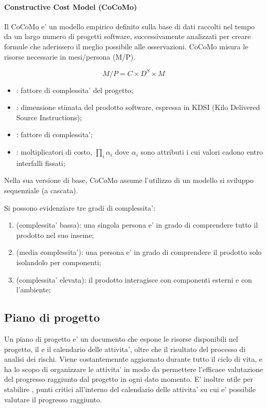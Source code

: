 \paragraph{Constructive Cost Model (CoCoMo)}

Il CoCoMo e' un modello empirico definito sulla base di dati raccolti nel tempo
da un largo numero di progetti software, successivamente analizzati per creare
formule che aderissero il meglio possibile alle osservazioni. CoCoMo misura le
risorse necessarie in mesi/persona (M/P).

\[
  M/P = C \times D^S \times M
\]

\begin{itemize}
  \item {}: fattore di complessita' del progetto;
  \item {}: dimensione stimata del prodotto software, espressa in KDSI
    (Kilo Delivered Source Instructions);
  \item {}: fattore di complessita';
  \item {}: moltiplicatori di costo, $\prod_i \alpha_i$ dove $\alpha_i$
    sono attributi i cui valori cadono entro interfalli fissati;
\end{itemize}

Nella sua versione di base, CoCoMo assume l'utilizzo di un modello si sviluppo
sequenziale (a cascata). 

Si possono evidenziare tre gradi di complessita':

\begin{enumerate}
  \item {} (complessita' bassa): una singola persona e' in grado
    di comprendere tutto il prodotto nel suo inseme;
  \item {} (media complessita'): una persona e' in grado di
    comprendere il prodotto solo isolandolo per componenti;
  \item {} (complessita' elevata): il prodotto
    interagisce con componenti esterni e con l'ambiente;
\end{enumerate}


\subsection{Piano di progetto}

Un piano di progetto e' un documento che espone le risorse disponibili nel
progetto, il  e il calendario delle attivita', oltre
che il risultato del processo di analisi dei rischi. Viene costantemennte
aggiornato durante tutto il ciclo di vita, e ha lo scopo di organizzare le
attivita' in modo da permettere l'efficace valutazione del progresso raggiunto
dal progetto in ogni dato momento. E' inoltre utile per stabilire
, punti critici all'interno del calendario delle attivita'
su cui e' possibile valutare il progresso raggiunto.

